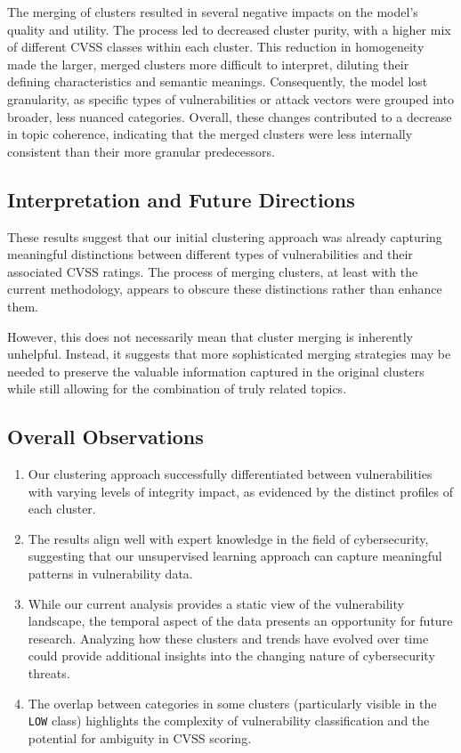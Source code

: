 \documentclass[12pt]{article}
\begin{document}
The merging of clusters resulted in several negative impacts on the model's quality and utility. The
process led to decreased cluster purity, with a higher mix of different CVSS classes within each
cluster. This reduction in homogeneity made the larger, merged clusters more difficult to interpret,
diluting their defining characteristics and semantic meanings. Consequently, the model lost
granularity, as specific types of vulnerabilities or attack vectors were grouped into broader, less
nuanced categories. Overall, these changes contributed to a decrease in topic coherence, indicating
that the merged clusters were less internally consistent than their more granular predecessors.


\subsection{Interpretation and Future Directions}

These results suggest that our initial clustering approach was already capturing meaningful
distinctions between different types of vulnerabilities and their associated CVSS ratings. The
process of merging clusters, at least with the current methodology, appears to obscure these
distinctions rather than enhance them.

However, this does not necessarily mean that cluster merging is inherently unhelpful. Instead, it
suggests that more sophisticated merging strategies may be needed to preserve the valuable
information captured in the original clusters while still allowing for the combination of truly
related topics.

\subsection{Overall Observations}

\begin{enumerate}

	\item Our clustering approach successfully differentiated between vulnerabilities with varying
	      levels of integrity impact, as evidenced by the distinct profiles of each cluster.

	\item The results align well with expert knowledge in the field of cybersecurity, suggesting
	      that our unsupervised learning approach can capture meaningful patterns in vulnerability
	      data.

	\item While our current analysis provides a static view of the vulnerability landscape, the
	      temporal aspect of the data presents an opportunity for future research. Analyzing how these
	      clusters and trends have evolved over time could provide additional insights into the
	      changing nature of cybersecurity threats.

	\item The overlap between categories in some clusters (particularly visible in the \texttt{LOW}
	      class) highlights the complexity of vulnerability classification and the potential for
	      ambiguity in CVSS scoring.

\end{enumerate}
\end{document}
